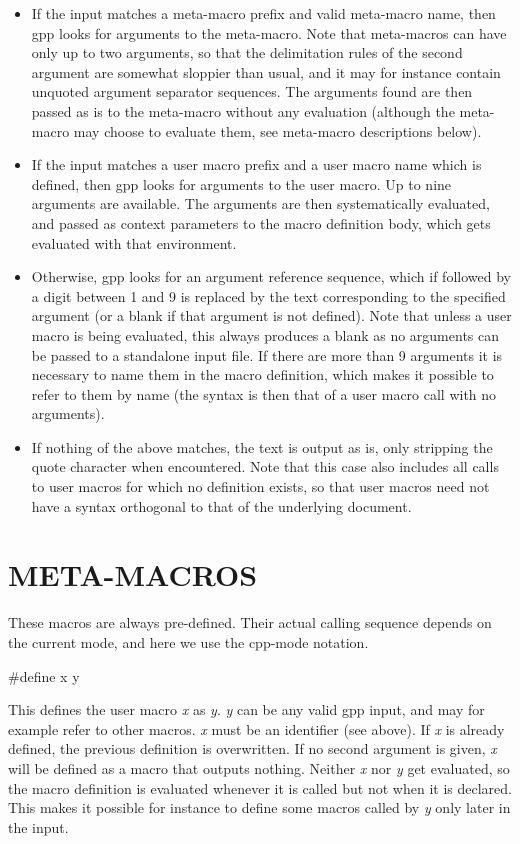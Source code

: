 \begin{itemize}
\item If the input matches a meta-macro prefix and valid meta-macro name, then
gpp looks for arguments to the meta-macro. Note that meta-macros can have only
up to two arguments, so that the delimitation rules of the second argument are
somewhat sloppier than usual, and it may for instance contain unquoted
argument separator sequences. The arguments found are then passed as is to the
meta-macro without any evaluation (although the meta-macro may choose to
evaluate them, see meta-macro descriptions below). 

\item If the input matches a user macro prefix and a user macro name which is
defined, then gpp looks for arguments to the user macro. Up to nine arguments
are available. The arguments are then systematically evaluated, and passed as
context parameters to the macro definition body, which gets evaluated with
that environment. 

\item Otherwise, gpp looks for an argument reference sequence, which if
followed by a digit between 1 and 9 is replaced by the text corresponding to
the specified argument (or a blank if that argument is not defined). Note that
unless a user macro is being evaluated, this always produces a blank as no
arguments can be passed to a standalone input file. If there are more than 9
arguments it is necessary to name them in the macro definition, which makes it
possible to refer to them by name (the syntax is then that of a user macro
call with no arguments). 

\item If nothing of the above matches, the text is output as is, only
stripping the quote character when encountered. Note that this case also
includes all calls to user macros for which no definition exists, so that user
macros need not have a syntax orthogonal to that of the underlying document. 
\end{itemize}

\htmlHR

\section{META-MACROS}

These macros are always pre-defined. Their actual calling sequence depends on
the current mode, and here we use the cpp-mode notation. 

{\bf 

\begin{PRE}
\#define x y
\end{PRE}

} This defines the user macro {\it x} as {\it y}. {\it y} can be any valid gpp
input, and may for example refer to other macros. {\it x} must be an
identifier (see above). If {\it x} is already defined, the previous definition
is overwritten. If no second argument is given, {\it x} will be defined as a
macro that outputs nothing. Neither {\it x} nor {\it y} get evaluated, so the
macro definition is evaluated whenever it is called but not when it is
declared. This makes it possible for instance to define some macros called by
{\it y} only later in the input. 

